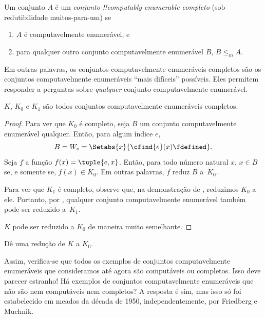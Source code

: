 \documentclass[../../../include/open-logic-section]{subfiles}
\begin{document}

\begin{defn}
Um conjunto $A$ é um \emph{conjunto !!{computably enumerable} completo}
(sob redutibilidade muitos-para-um) se
\begin{enumerate}
\item $A$ é computavelmente enumerável, e
\item para qualquer outro conjunto computavelmente enumerável $B$,
  $B \leq_m A$.
\end{enumerate}
\end{defn}

Em outras palavras, os conjuntos computavelmente enumeráveis completos
são os conjuntos computavelmente enumeráveis ``mais difíceis''
possíveis. Eles permitem responder a perguntas sobre
\emph{qualquer} conjunto computavelmente enumerável.

\begin{thm}
$K$, $K_0$ e $K_1$ são todos conjuntos computavelmente enumeráveis
completos.
\end{thm}

\begin{proof}
Para ver que $K_0$ é completo, seja $B$ um conjunto computavelmente
enumerável qualquer. Então, para algum índice $e$,
\[
B = W_e = \Setabs{x}{\cfind{e}(x) \fdefined}.
\]
Seja $f$ a função $f(x) = \tuple{e, x}$. Então, para todo número
natural $x$, $x \in B$ se, e somente se, $f(x) \in K_0$. Em outras
palavras, $f$ reduz $B$ a~$K_0$.

Para ver que $K_1$ é completo, observe que, na demonstração de
, reduzimos $K_0$ a ele. Portanto, por
, qualquer conjunto computavelmente
enumerável também pode ser reduzido a~$K_1$.

$K$ pode ser reduzido a $K_0$ de maneira muito semelhante.
\end{proof}

\begin{prob}
Dê uma redução de $K$ a $K_0$.
\end{prob}

\begin{digress}
Assim, verifica-se que todos os exemplos de conjuntos computavelmente
enumeráveis que consideramos até agora são computáveis ou completos.
Isso deve parecer estranho!{} Há exemplos de conjuntos computavelmente
enumeráveis que não são nem computáveis nem completos? A resposta é
sim, mas isso só foi estabelecido em meados da década de 1950,
independentemente, por Friedberg e Muchnik.
\end{digress}
\end{document}
